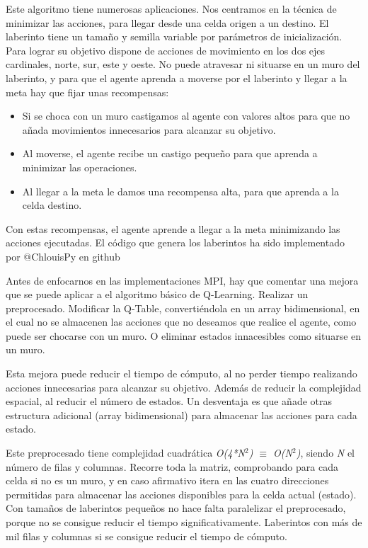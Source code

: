 		Este algoritmo tiene numerosas aplicaciones. Nos centramos en la técnica de minimizar las acciones, para llegar desde una celda origen a un destino. El laberinto tiene un tamaño y semilla variable por parámetros de inicialización. Para lograr su objetivo dispone de acciones de movimiento en los dos ejes cardinales, norte, sur, este y oeste. No puede atravesar ni situarse en un muro del laberinto, y para que el agente aprenda a moverse por el laberinto y llegar a la meta hay que fijar unas recompensas:
		\begin{itemize}
			\item Si se choca con un muro castigamos al agente con valores altos para que no añada movimientos innecesarios para alcanzar su objetivo.
			\vspace*{-0.2cm}
			\item Al moverse, el agente recibe un castigo pequeño para que aprenda a minimizar las operaciones.
			\vspace*{-0.2cm}
			\item Al llegar a la meta le damos una recompensa alta, para que aprenda a la celda destino. 					
		\end{itemize}
	
		Con estas recompensas, el agente aprende a llegar a la meta minimizando las acciones ejecutadas. El código que genera los laberintos ha sido implementado por @ChlouisPy en github\cite{MazeGenerator}


		Antes de enfocarnos en las implementaciones MPI, hay que comentar una mejora que se puede aplicar a el algoritmo básico de Q-Learning. Realizar un preprocesado. Modificar la Q-Table, convertiéndola en un array bidimensional, en el cual no se almacenen las acciones que no deseamos que realice el agente, como puede ser chocarse con un muro. O eliminar estados innacesibles como situarse en un muro.
		
		Esta mejora puede reducir el tiempo de cómputo, al no perder tiempo realizando acciones innecesarias para alcanzar su objetivo. Además de reducir la complejidad espacial, al reducir el número de estados. Un desventaja es que añade otras estructura adicional (array bidimensional) para almacenar las acciones para cada estado. 
		
		Este preprocesado tiene complejidad cuadrática \textit{O(4*N\(^{2}\)) $\equiv$ O(N\(^{2}\))}, siendo \textit{N} el número de filas y columnas. Recorre toda la matriz, comprobando para cada celda si no es un muro, y en caso afirmativo itera en las cuatro direcciones permitidas para almacenar las acciones disponibles para la celda actual (estado). Con tamaños de laberintos pequeños no hace falta paralelizar el preprocesado, porque no se consigue reducir el tiempo significativamente. Laberintos con más de mil filas y columnas si se consigue reducir el tiempo de cómputo.
		

